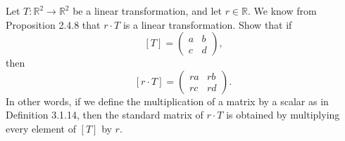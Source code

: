 \documentclass[12pt]{article}
\newenvironment{problem}[2][Problem]
{
	\begin{trivlist} 
		\item[\hskip \labelsep {\bfseries #1 #2:}]
	}
{
	\end{trivlist}
	}
\begin{document}
\newpage
\begin{problem}{6}
Let $T:\mathbb{R}^2 \to \mathbb{R}^2$ be a linear transformation, and let $r \in \mathbb{R}$. We know from Proposition 2.4.8 that $r \cdot T$ is a linear transformation. Show that if
\[
[T]=\begin{pmatrix} a&b\\c&d\end{pmatrix}\text{,}
\]
then
\[
[r \cdot T]=\begin{pmatrix} ra&rb\\rc&rd\end{pmatrix}\text{.}
\]
In other words, if we define the multiplication of a matrix by a scalar as in Definition 3.1.14, then the standard matrix of $r \cdot T$ is obtained by multiplying every element of $[T]$ by $r$.

\noindent
\newline
\newline


\end{problem}
\end{document}
